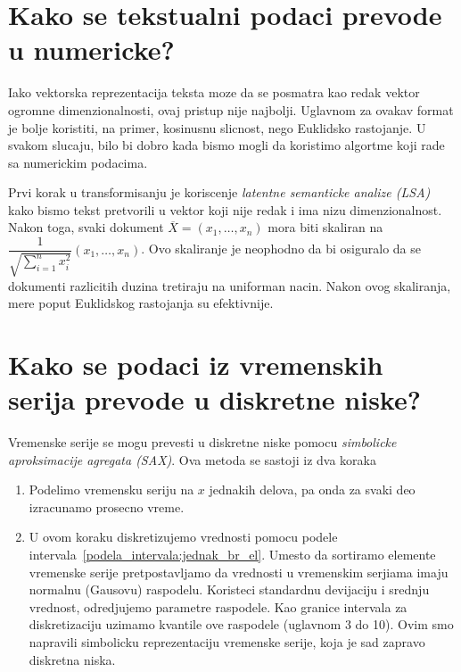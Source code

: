 \documentclass[a4paper]{article}
\begin{document}
\section{Kako se tekstualni podaci prevode u numericke?}
Iako vektorska reprezentacija teksta moze da se posmatra kao redak vektor ogromne dimenzionalnosti,
ovaj pristup nije najbolji. Uglavnom za ovakav format je bolje koristiti, na primer, kosinusnu
slicnost, nego Euklidsko rastojanje. U svakom slucaju, bilo bi dobro kada bismo mogli da koristimo
algortme koji rade sa numerickim podacima.

Prvi korak u transformisanju je koriscenje \emph{latentne semanticke analize (LSA)} kako bismo tekst
pretvorili u vektor koji nije redak i ima nizu dimenzionalnost. Nakon toga, svaki dokument
\(\overline{X} = (x_1, \ldots, x_n)\) mora biti skaliran na
\(\dfrac{1}{\sqrt{\sum_{i=1}^{n}x_i^2}}(x_1, \ldots, x_n)\). Ovo skaliranje je neophodno da bi
osiguralo da se dokumenti razlicitih duzina tretiraju na uniforman nacin. Nakon ovog skaliranja,
mere poput Euklidskog rastojanja su efektivnije.

\section{Kako se podaci iz vremenskih serija prevode u diskretne niske?}
Vremenske serije se mogu prevesti u diskretne niske pomocu \emph{simbolicke aproksimacije agregata
(SAX)}. Ova metoda se sastoji iz dva koraka
\begin{enumerate}
    \item Podelimo vremensku seriju na \(x\) jednakih delova, pa onda za svaki deo izracunamo
        prosecno vreme.
    \item U ovom koraku diskretizujemo vrednosti pomocu podele
        intervala~\ref{podela_intervala:jednak_br_el}. Umesto da sortiramo elemente vremenske serije
        pretpostavljamo da vrednosti u vremenskim serjiama imaju normalnu (Gausovu) raspodelu.
        Koristeci standardnu devijaciju i srednju vrednost, odredjujemo parametre raspodele. Kao
        granice intervala za diskretizaciju uzimamo kvantile ove raspodele (uglavnom 3 do 10). Ovim
        smo napravili simbolicku reprezentaciju vremenske serije, koja je sad zapravo diskretna
        niska.
\end{enumerate}
\end{document}
